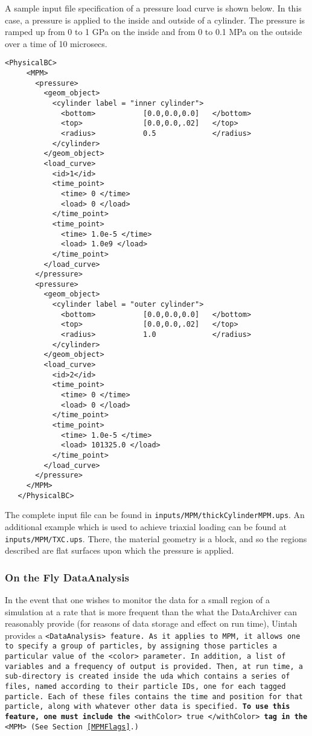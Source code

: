 A sample input file specification of a pressure load curve is shown below.
In this case, a pressure is applied to the inside and outside of a cylinder.
The pressure is ramped up from 0 to 1 GPa on the inside and from 0 to 0.1 MPa
on the outside over a time of 10 microsecs.
\begin{Verbatim}[fontsize=\footnotesize]
   <PhysicalBC>
     <MPM>
       <pressure>
         <geom_object>
           <cylinder label = "inner cylinder">
             <bottom>           [0.0,0.0,0.0]   </bottom>
             <top>              [0.0,0.0,.02]   </top>
             <radius>           0.5             </radius>
           </cylinder>
         </geom_object>
         <load_curve>
           <id>1</id>
           <time_point>
             <time> 0 </time>
             <load> 0 </load>
           </time_point>
           <time_point>
             <time> 1.0e-5 </time>
             <load> 1.0e9 </load>
           </time_point>
         </load_curve>
       </pressure>
       <pressure>
         <geom_object>
           <cylinder label = "outer cylinder">
             <bottom>           [0.0,0.0,0.0]   </bottom>
             <top>              [0.0,0.0,.02]   </top>
             <radius>           1.0             </radius>
           </cylinder>
         </geom_object>
         <load_curve>
           <id>2</id>
           <time_point>
             <time> 0 </time>
             <load> 0 </load>
           </time_point>
           <time_point>
             <time> 1.0e-5 </time>
             <load> 101325.0 </load>
           </time_point>
         </load_curve>
       </pressure>
     </MPM>
   </PhysicalBC>
\end{Verbatim}
The complete input file can be found in \verb|inputs/MPM/thickCylinderMPM.ups|. 
An additional example which is used to achieve triaxial loading can be found
at \verb|inputs/MPM/TXC.ups|.  There, the material geometry is a block, and so
the regions described are flat surfaces upon which the pressure is applied.

\subsubsection{On the Fly DataAnalysis} \label{OTFA_MPM}

In the event that one wishes to monitor the data for a small region of a
simulation at a rate that is more frequent than the what the DataArchiver
can reasonably provide (for reasons of data storage and effect on run time),
Uintah provides a \tt <DataAnalysis> \normalfont feature.  As it applies
to MPM, it allows one to specify a group of particles, by assigning those
particles a particular value of the \tt <color> \normalfont parameter.
In addition, a list of variables and a frequency of output is provided.
Then, at run time, a sub-directory is created inside the uda which contains
a series of files, named according to their particle IDs, one for each
tagged particle.  Each of these files contains the time and position for
that particle, along with whatever other data is specified.  {\bf To use this
feature, one must include the} \tt <withColor>   true   </withColor> \normalfont
{\bf tag in the} \tt <MPM> 
(See Section~\ref{MPMFlags}.)

